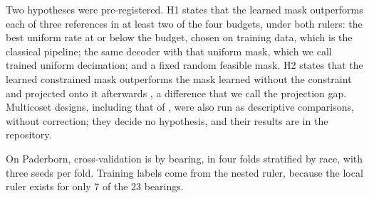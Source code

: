 Two hypotheses were pre-registered. H1 states that the learned mask outperforms each of three
references in at least two of the four budgets, under both rulers: the best uniform rate at or
below the budget, chosen on training data, which is the classical pipeline; the same decoder with
that uniform mask, which we call trained uniform decimation; and a fixed random feasible mask. H2
states that the learned constrained mask outperforms the mask learned without the constraint and
projected onto it afterwards \citep{huijben2020dps,weiss2021pilot}, a difference that we call the
projection gap. Multicoset designs, including that of \citet{venkataramani2001optimal}, were also
run as descriptive comparisons, without correction; they decide no hypothesis, and their results
are in the repository.

On Paderborn, cross-validation is by bearing, in four folds stratified by race, with three seeds
per fold. Training labels come from the nested ruler, because the local ruler exists for only 7 of
the 23 bearings.
